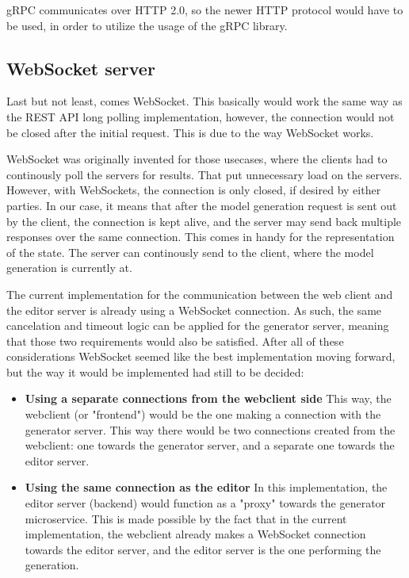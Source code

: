 	gRPC communicates over HTTP 2.0, so the newer HTTP protocol would have to be used, in order to utilize the usage of the gRPC library.

\subsection{WebSocket server}
	Last but not least, comes WebSocket. This basically would work the same way as the REST API long polling implementation,
	however, the connection would not be closed after the initial request. This is due to the way WebSocket works.
	
	WebSocket was originally invented for those usecases, where the clients
	had to continously poll the servers for results. That put unnecessary load on the servers. However, with WebSockets, the connection 
	is only closed, if desired by either parties. In our case, it means that after the model generation request is sent out by the client,
	the connection is kept alive, and the server may send back multiple responses over the same connection.
	This comes in handy for the representation of the state. The server can continously send to the client,
	where the model generation is currently at.

	The current implementation for the communication between the web client and the editor server is already using a WebSocket connection.
	As such, the same cancelation and timeout logic can be applied for the generator server, meaning that those two requirements would also be satisfied.
	After all of these considerations WebSocket seemed like the best implementation moving forward, but the way it would be implemented
	had still to be decided:

	\begin{itemize}
			\item \textbf{Using a separate connections from the webclient side}
			This way, the webclient (or "frontend") would be the one making a connection with the generator server. This way
			there would be two connections created from the webclient: one towards the generator server, and a separate one 
			towards the editor server.

			\item \textbf{Using the same connection as the editor}
			In this implementation, the editor server (backend) would function as a "proxy" towards the generator microservice. This is made possible 
			by the fact that in the current implementation, the webclient already makes a WebSocket connection towards the editor server, and 
			the editor server is the one performing the generation.
	\end{itemize}

